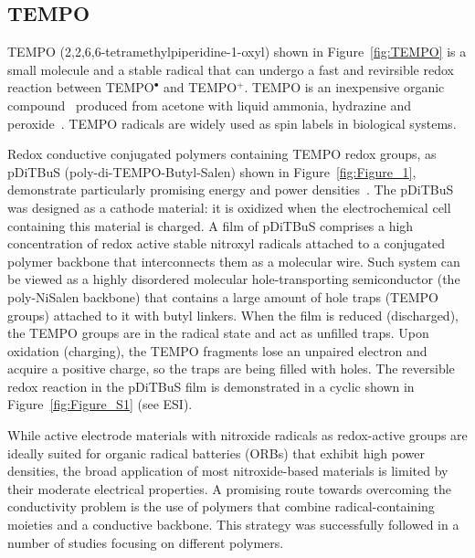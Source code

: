 \par
\subsection{TEMPO}
TEMPO (2,2,6,6-tetramethylpiperidine-1-oxyl) shown in Figure~\ref{fig:TEMPO} is a small molecule and a stable radical that can undergo a fast and revirsible redox reaction between TEMPO$^\bullet$ and TEMPO$^+$. TEMPO is an inexpensive organic compound~\cite{Vereshchagin2022} produced from acetone with liquid ammonia, hydrazine and peroxide~\cite{Casado_2021_book}. TEMPO radicals are widely used as spin labels in biological systems.




Redox conductive conjugated polymers containing TEMPO redox groups, as pDiTBuS (poly-di-TEMPO-Butyl-Salen) shown in Figure~\ref{fig:Figure_1}, demonstrate particularly promising energy and power densities~\cite{Vereshchagin2020}. The pDiTBuS was designed as a cathode material: it is oxidized when the electrochemical cell containing this material is charged. A film of pDiTBuS comprises a high concentration of redox active stable nitroxyl radicals attached to a conjugated polymer backbone that interconnects them as a molecular wire. Such system can be viewed as a highly disordered molecular hole-transporting semiconductor (the poly-NiSalen backbone) that contains a large amount of hole traps (TEMPO groups) attached to it with butyl linkers. When the film is reduced (discharged), the TEMPO groups are in the radical state and act as unfilled traps. Upon oxidation (charging), the TEMPO fragments lose an unpaired electron and acquire a positive charge, so the traps are being filled with holes. The reversible redox reaction in the pDiTBuS film is demonstrated in a cyclic  shown in Figure~\ref{fig:Figure_S1} (see ESI).

\par
While active electrode materials with nitroxide radicals as redox-active groups are ideally suited for organic radical batteries (ORBs) that exhibit high power densities, the broad application of most nitroxide-based materials is limited by their moderate electrical properties. A promising route towards overcoming the conductivity problem is the use of polymers that combine radical-containing moieties and a conductive backbone. This strategy was successfully followed in a number of studies focusing on different polymers.\cite{oyaizu2015_polymerjournal, bahaceci2013_jpowersources, katsumata2006_mrc, xu2014_electact, aydin2015_jsoistatelect, schwartz2018_synthmet}

